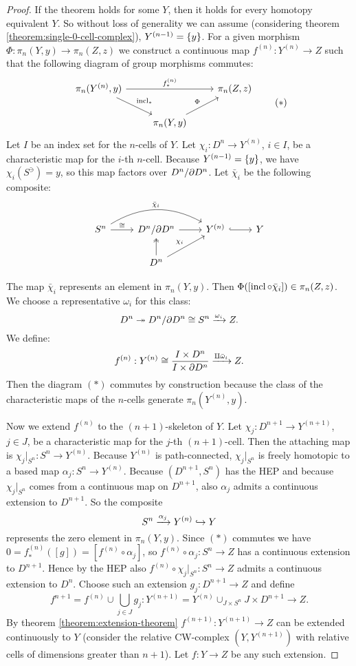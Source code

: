 \begin{proof}
If the theorem holds for some $Y$, then it holds for every homotopy equivalent $Y$. So without loss of generality we can assume (considering theorem \ref{theorem:single-0-cell-complex}), $Y^{({n-1})}=\{y\}$. For a given morphism $\Phi:\pi_n(Y,y)\to\pi_n(Z,z)$ we construct a continuous map $f^{(n)}:Y^{(n)}\to Z$ such that the following diagram of group morphisms commutes:
\[\begin{tikzcd}
\pi_n(Y^{(n)},y) \ar[dr,"\incl_*"] \ar[rr,"f^{(n)}_*"] & & \pi_n(Z,z) \\
& \pi_n(Y,y) \ar[ur,"\Phi"] &
\end{tikzcd}
\tag{$*$}\]
Let $I$ be an index set for the $n$-cells of $Y$. Let $\chi_i:D^n\to Y^{(n)}$, $i\in I$, be a characteristic map for the $i$-th $n$-cell. Because $Y^{({n-1})}=\{y\}$, we have $\chi_i(S^\ni)=y$, so this map factors over $D^n/\partial D^n$. Let $\bar\chi_i$ be the following composite:
\[\begin{tikzcd}
S^n \ar[r,"\cong"] \ar[rr,bend left,"\bar\chi_i"] & D^n/\de D^n \ar[r] & Y^{(n)} \ar[r,hook] & Y \\
& D^n \ar[u,two heads] \ar[ur,"\chi_i"] & & 
\end{tikzcd}\]

The map $\bar\chi_i$ represents an element in $\pi_n(Y,y)$. Then $\Phi([\operatorname{incl}\circ\bar\chi_i])\in\pi_n(Z,z)$. We choose a representative $\omega_i$ for this class:
\[D^n\twoheadrightarrow D^n/\partial D^n\cong S^n\xrightarrow{\omega_i}Z.\]
We define:
\[f^{(n)}:Y^{(n)}\cong\frac{I\times D^n}{I\times\partial D^n}\xrightarrow{\amalg\bar\omega_i}Z.\]
Then the diagram $(*)$ commutes by construction because the class of the characteristic maps of the $n$-cells generate $\pi_n(Y^{(n)},y)$.

Now we extend $f^{(n)}$ to the $(n+1)$-skeleton of $Y$. Let $\chi_j:D^{n+1}\to Y^{(n+1)}$, $j\in J$, be a characteristic map for the $j$-th $(n+1)$-cell. Then the attaching map is $\chi_j|_{S^n}:S^n\to Y^{(n)}$. Because $Y^{(n)}$ is path-connected, $\chi_j|_{S^n}$ is freely homotopic to a based map $\alpha_j:S^n\to Y^{(n)}$. Because $(D^{n+1},S^n)$ has the HEP and because $\chi_j|_{S^n}$ comes from a continuous map on $D^{n+1}$, also $\alpha_j$ admits a continuous extension to $D^{n+1}$. So the composite
\[S^n\xrightarrow{\alpha_j}Y^{(n)}\hookrightarrow Y\]
represents the zero element in $\pi_n(Y,y)$. Since $(*)$ commutes we have $0=f^{(n)}_*([g])=[f^{(n)}\circ\alpha_j]$, so $f^{(n)}\circ\alpha_j:S^n\to Z$ has a continuous extension to $D^{n+1}$. Hence by the HEP also $f^{(n)}\circ\chi_j|_{S^n}:S^n\to Z$ admits a continuous extension to $D^n$. Choose such an extension $g_j:D^{n+1}\to Z$ and define
\[f^{n+1}=f^{(n)}\cup\bigcup_{j\in J}g_j:Y^{(n+1)}=Y^{(n)}\cup_{J\times S^n}J\times D^{n+1}\to Z.\]
By theorem \ref{theorem:extension-theorem} $f^{(n+1)}:Y^{(n+1)}\to Z$ can be extended continuously to $Y$ (consider the relative CW-complex $(Y,Y^{(n+1)})$ with relative cells of dimensions greater than $n+1$). Let $f:Y\to Z$ be any such extension.


\end{proof}
